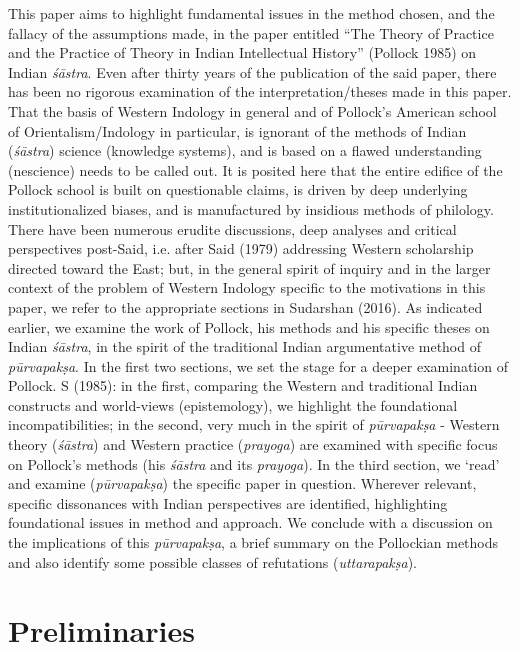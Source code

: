 This paper aims to highlight fundamental issues in the method chosen, and the fallacy of the assumptions made, in the paper entitled ``The Theory of Practice and the Practice of Theory in Indian Intellectual History'' (Pollock 1985) on Indian {\sl śāstra}. Even after thirty years of the publication of the said paper, there has been no rigorous examination of the interpretation/theses made in this paper. That the basis of Western Indology in general and of Pollock's American school of Orientalism/Indology in particular, is ignorant of the methods of Indian ({\sl śāstra}) science (knowledge systems), and is based on a flawed understanding (nescience) needs to be called out. It is posited here that the entire edifice of the Pollock school is built on questionable claims, is driven by deep underlying institutionalized biases, and is manufactured by insidious methods of philology. There have been numerous erudite discussions, deep analyses and critical perspectives post-Said, i.e. after Said (1979) addressing Western scholarship directed toward the East; but, in the general spirit of inquiry and in the larger context of the problem of Western Indology specific to the motivations in this paper, we refer to the appropriate sections in Sudarshan (2016).  As indicated earlier, we examine the work of Pollock, his methods and his specific theses on Indian {\sl śāstra}, in the spirit of the traditional Indian argumentative method of {\sl pūrvapakṣa}. In the first two sections, we set the stage for a deeper examination of Pollock. S (1985): in the first, comparing the Western and traditional Indian constructs and world-views (epistemology), we highlight the foundational incompatibilities; in the second, very much in the spirit of {\sl pūrvapakṣa} - Western theory ({\sl śāstra}) and Western practice ({\sl prayoga}) are examined with specific focus on Pollock's methods (his {\sl śāstra} and its {\sl prayoga}). In the third section, we `read' and examine ({\sl pūrvapakṣa}) the specific paper in question. Wherever relevant, specific dissonances with Indian perspectives are identified, highlighting foundational issues in method and approach. We conclude with a discussion on the implications of this {\sl pūrvapakṣa}, a brief summary on the Pollockian methods and also identify some possible classes of refutations ({\sl uttarapakṣa}).

\section*{Preliminaries}

